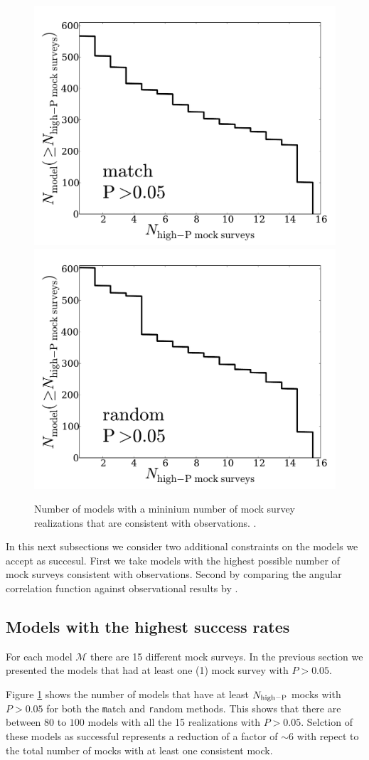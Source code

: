 \documentclass[usenatbib]{mn2e}
\begin{document}
\begin{figure}
\begin{center}
\includegraphics[width=0.46\linewidth,angle=0]{./plots/Fig4_match_P5.pdf}
\hspace{5mm}
\includegraphics[width=0.46\linewidth,angle=0]{./plots/Fig4_random_P5.pdf}
\end{center} 
\caption{ Number of models with a mininium number of mock survey
  realizations that are consistent with observations.
  \label{fig:high_success_rate}.}  
\end{figure}
 
In this next subsections we consider two additional constraints on the models
we accept as succesul. First we take models with the highest possible
number of mock surveys consistent with observations. Second by
comparing the angular correlation function against observational
results by \cite{Hayashino2004}.   

\subsection{Models with the highest success rates}

For each model ${\mathcal M}$ there are 15 different mock surveys. In the
previous section we presented the models that had at least one (1)
mock survey with $P>0.05$.

Figure \ref{fig:high_success_rate} shows the number of models
that have at least $N_{\rm high-P}$ mocks with $P>0.05$ for both the
{\texttt  match} and {\texttt random} methods.  This shows that there
are between $80$ to $100$ models with all the 15 realizations with
$P>0.05$. Selction of these models as successful represents a
reduction of a factor of $\sim 6$ with repect to the total number of
mocks with at least one consistent mock.  
\end{document}
